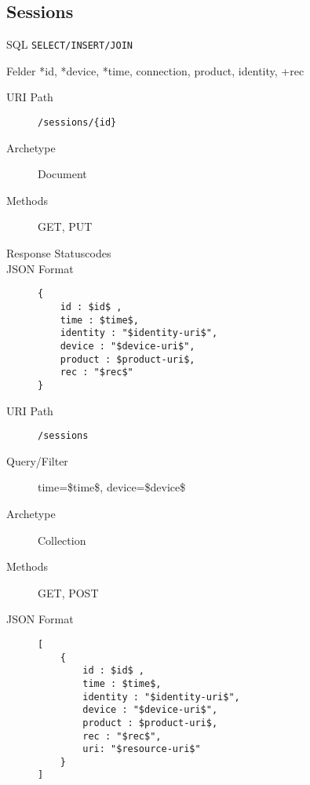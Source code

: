 \documentclass[10pt,a4paper]{scrartcl}
\begin{document}
\pagebreak
\subsection{Sessions}

\begin{description*}
    \item[SQL] \texttt{SELECT/INSERT/JOIN}
    \item[Felder] *id, *device, *time, connection, product, identity, +rec
\end{description*}


\begin{mdframed}[style=def]
\begin{description}
	\item[URI Path] \texttt{/sessions/\{id\}}
	\item[Archetype] Document
	\item[Methods] GET, PUT
	\item[Response Statuscodes] \hfill
	\item[JSON Format] \hfill
\begin{lstlisting}
{
	id : $id$ ,
	time : $time$,
	identity : "$identity-uri$",
	device : "$device-uri$",
	product : $product-uri$,
	rec : "$rec$"
}
\end{lstlisting}
\end{description}
\end{mdframed}

\begin{mdframed}[style=def]
\begin{description}
	\item[URI Path] \texttt{/sessions}
	\item[Query/Filter]	time=\$time\$, device=\$device\$ 
	\item[Archetype] Collection
	\item[Methods] GET, POST
	\item[JSON Format] \hfill
\begin{lstlisting}
[
	{
	    id : $id$ ,
    	time : $time$,
    	identity : "$identity-uri$",
    	device : "$device-uri$",
    	product : $product-uri$,
    	rec : "$rec$",
    	uri: "$resource-uri$"
    }
]
\end{lstlisting}
\end{description}
\end{mdframed}
\end{document}
